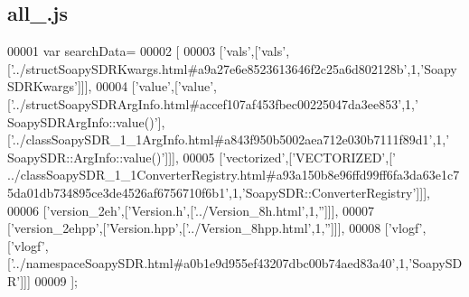\subsection{all\+\_.\+js}
\label{all__12_8js_source}

\begin{DoxyCode}
00001 var searchData=
00002 [
00003   [\textcolor{stringliteral}{'vals'},[\textcolor{stringliteral}{'vals'},[\textcolor{stringliteral}{'../structSoapySDRKwargs.html#a9a27e6e8523613646f2c25a6d802128b'},1,\textcolor{stringliteral}{'SoapySDRKwargs'}]]],
00004   [\textcolor{stringliteral}{'value'},[\textcolor{stringliteral}{'value'},[\textcolor{stringliteral}{'../structSoapySDRArgInfo.html#accef107af453fbec00225047da3ee853'},1,\textcolor{stringliteral}{'
      SoapySDRArgInfo::value()'}],[\textcolor{stringliteral}{'../classSoapySDR\_1\_1ArgInfo.html#a843f950b5002aea712e030b7111f89d1'},1,\textcolor{stringliteral}{'
      SoapySDR::ArgInfo::value()'}]]],
00005   [\textcolor{stringliteral}{'vectorized'},[\textcolor{stringliteral}{'VECTORIZED'},[\textcolor{stringliteral}{'
      ../classSoapySDR\_1\_1ConverterRegistry.html#a93a150b8e96ffd99ff6fa3da63e1c75da01db734895ce3de4526af6756710f6b1'},1,\textcolor{stringliteral}{'SoapySDR::ConverterRegistry'}]]],
00006   [\textcolor{stringliteral}{'version\_2eh'},[\textcolor{stringliteral}{'Version.h'},[\textcolor{stringliteral}{'../Version\_8h.html'},1,\textcolor{stringliteral}{''}]]],
00007   [\textcolor{stringliteral}{'version\_2ehpp'},[\textcolor{stringliteral}{'Version.hpp'},[\textcolor{stringliteral}{'../Version\_8hpp.html'},1,\textcolor{stringliteral}{''}]]],
00008   [\textcolor{stringliteral}{'vlogf'},[\textcolor{stringliteral}{'vlogf'},[\textcolor{stringliteral}{'../namespaceSoapySDR.html#a0b1e9d955ef43207dbc00b74aed83a40'},1,\textcolor{stringliteral}{'SoapySDR'}]]]
00009 ];
\end{DoxyCode}
